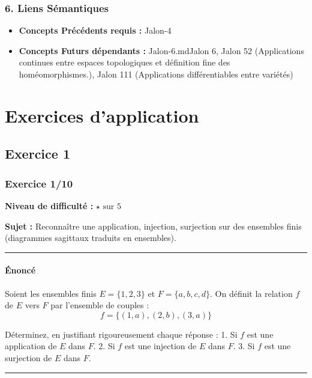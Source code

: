 \documentclass[12pt,a4paper]{report}
\providecommand{\tightlist}{%
  \setlength{\itemsep}{0pt}\setlength{\parskip}{0pt}}
\begin{document}
\subsection{6. Liens Sémantiques}\label{liens-suxe9mantiques}

\begin{itemize}
\tightlist
\item
  \textbf{Concepts Précédents requis :} Jalon-4
\item
  \textbf{Concepts Futurs dépendants :} Jalon-6.md\textbar Jalon 6,
  Jalon 52 (Applications continues entre espaces topologiques et
  définition fine des homéomorphismes.), Jalon 111 (Applications
  différentiables entre variétés)
\end{itemize}
\chapter{Exercices d'application}
\section{Exercice 1}
\subsection{Exercice 1/10}\label{exercice-110}

\textbf{Niveau de difficulté :} \(\star \text{ sur } 5\)

\textbf{Sujet :} Reconnaître une application, injection, surjection sur
des ensembles finis (diagrammes sagittaux traduits en ensembles).

\begin{center}\rule{0.5\linewidth}{0.5pt}\end{center}

\subsubsection{Énoncé}\label{uxe9noncuxe9}

Soient les ensembles finis \(E = \{1, 2, 3\}\) et
\(F = \{a, b, c, d\}\). On définit la relation \(f\) de \(E\) vers \(F\)
par l'ensemble de couples : \[f = \{(1, a), (2, b), (3, a)\}\]

Déterminez, en justifiant rigoureusement chaque réponse : 1. Si \(f\)
est une application de \(E\) dans \(F\). 2. Si \(f\) est une injection
de \(E\) dans \(F\). 3. Si \(f\) est une surjection de \(E\) dans \(F\).

\begin{center}\rule{0.5\linewidth}{0.5pt}\end{center}
\end{document}
